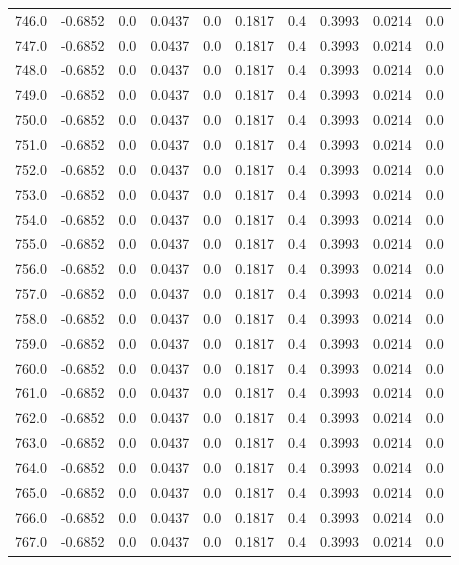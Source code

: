\begin{longtable}{lrrrrrrrrr}
746.0 & -0.6852 & 0.0 & 0.0437 & 0.0 & 0.1817 & 0.4 & 0.3993 & 0.0214 & 0.0 \\
747.0 & -0.6852 & 0.0 & 0.0437 & 0.0 & 0.1817 & 0.4 & 0.3993 & 0.0214 & 0.0 \\
748.0 & -0.6852 & 0.0 & 0.0437 & 0.0 & 0.1817 & 0.4 & 0.3993 & 0.0214 & 0.0 \\
749.0 & -0.6852 & 0.0 & 0.0437 & 0.0 & 0.1817 & 0.4 & 0.3993 & 0.0214 & 0.0 \\
750.0 & -0.6852 & 0.0 & 0.0437 & 0.0 & 0.1817 & 0.4 & 0.3993 & 0.0214 & 0.0 \\
751.0 & -0.6852 & 0.0 & 0.0437 & 0.0 & 0.1817 & 0.4 & 0.3993 & 0.0214 & 0.0 \\
752.0 & -0.6852 & 0.0 & 0.0437 & 0.0 & 0.1817 & 0.4 & 0.3993 & 0.0214 & 0.0 \\
753.0 & -0.6852 & 0.0 & 0.0437 & 0.0 & 0.1817 & 0.4 & 0.3993 & 0.0214 & 0.0 \\
754.0 & -0.6852 & 0.0 & 0.0437 & 0.0 & 0.1817 & 0.4 & 0.3993 & 0.0214 & 0.0 \\
755.0 & -0.6852 & 0.0 & 0.0437 & 0.0 & 0.1817 & 0.4 & 0.3993 & 0.0214 & 0.0 \\
756.0 & -0.6852 & 0.0 & 0.0437 & 0.0 & 0.1817 & 0.4 & 0.3993 & 0.0214 & 0.0 \\
757.0 & -0.6852 & 0.0 & 0.0437 & 0.0 & 0.1817 & 0.4 & 0.3993 & 0.0214 & 0.0 \\
758.0 & -0.6852 & 0.0 & 0.0437 & 0.0 & 0.1817 & 0.4 & 0.3993 & 0.0214 & 0.0 \\
759.0 & -0.6852 & 0.0 & 0.0437 & 0.0 & 0.1817 & 0.4 & 0.3993 & 0.0214 & 0.0 \\
760.0 & -0.6852 & 0.0 & 0.0437 & 0.0 & 0.1817 & 0.4 & 0.3993 & 0.0214 & 0.0 \\
761.0 & -0.6852 & 0.0 & 0.0437 & 0.0 & 0.1817 & 0.4 & 0.3993 & 0.0214 & 0.0 \\
762.0 & -0.6852 & 0.0 & 0.0437 & 0.0 & 0.1817 & 0.4 & 0.3993 & 0.0214 & 0.0 \\
763.0 & -0.6852 & 0.0 & 0.0437 & 0.0 & 0.1817 & 0.4 & 0.3993 & 0.0214 & 0.0 \\
764.0 & -0.6852 & 0.0 & 0.0437 & 0.0 & 0.1817 & 0.4 & 0.3993 & 0.0214 & 0.0 \\
765.0 & -0.6852 & 0.0 & 0.0437 & 0.0 & 0.1817 & 0.4 & 0.3993 & 0.0214 & 0.0 \\
766.0 & -0.6852 & 0.0 & 0.0437 & 0.0 & 0.1817 & 0.4 & 0.3993 & 0.0214 & 0.0 \\
767.0 & -0.6852 & 0.0 & 0.0437 & 0.0 & 0.1817 & 0.4 & 0.3993 & 0.0214 & 0.0 \\

\end{longtable}
